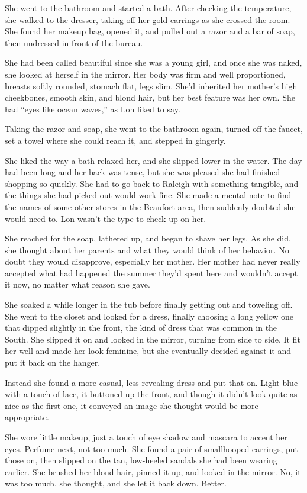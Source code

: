 \documentclass[10pt, twoside, openright]{book}
\begin{document}
She went to the bathroom and started a bath. After checking the
temperature, she walked to the dresser, taking off her gold earrings as
she crossed the room. She found her makeup bag, opened it, and pulled
out a razor and a bar of soap, then undressed in front of the bureau.

She had been called beautiful since she was a young girl, and once she
was naked, she looked at herself in the mirror. Her body was firm and
well proportioned, breasts softly rounded, stomach flat, legs slim.
She'd inherited her mother's high cheekbones, smooth skin, and blond
hair, but her best feature was her own. She had ``eyes like ocean
waves,'' as Lon liked to say.

Taking the razor and soap, she went to the bathroom again, turned off
the faucet, set a towel where she could reach it, and stepped in
gingerly.

She liked the way a bath relaxed her, and she slipped lower in the
water. The day had been long and her back was tense, but she was pleased
she had finished shopping so quickly. She had to go back to Raleigh with
something tangible, and the things she had picked out would work fine.
She made a mental note to find the names of some other stores in the
Beaufort area, then suddenly doubted she would need to. Lon wasn't the
type to check up on her.

She reached for the soap, lathered up, and began to shave her legs. As
she did, she thought about her parents and what they would think of her
behavior. No doubt they would disapprove, especially her mother. Her
mother had never really accepted what had happened the summer they'd
spent here and wouldn't accept it now, no matter what reason she gave.

She soaked a while longer in the tub before finally getting out and
toweling off. She went to the closet and looked for a dress, finally
choosing a long yellow one that dipped slightly in the front, the kind
of dress that was common in the South. She slipped it on and looked in
the mirror, turning from side to side. It fit her well and made her look
feminine, but she eventually decided against it and put it back on the
hanger.

Instead she found a more casual, less revealing dress and put that on.
Light blue with a touch of lace, it buttoned up the front, and though it
didn't look quite as nice as the first one, it conveyed an image she
thought would be more appropriate.

She wore little makeup, just a touch of eye shadow and mascara to accent
her eyes. Perfume next, not too much. She found a pair of smallhooped
earrings, put those on, then slipped on the tan, low-heeled sandals she
had been wearing earlier. She brushed her blond hair, pinned it up, and
looked in the mirror. No, it was too much, she thought, and she let it
back down. Better.
\end{document}
